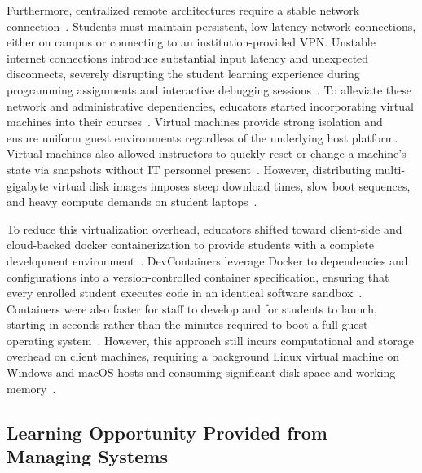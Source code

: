 Furthermore, centralized remote architectures require a stable network connection~\cite{valstarUsingDevContainersStandardize2020}.
Students must maintain persistent, low-latency network connections, either on
campus or connecting to an institution-provided VPN. Unstable internet connections
introduce substantial input latency and unexpected disconnects, severely
disrupting the student learning experience during programming assignments and
interactive debugging sessions~\cite{valstarUsingDevContainersStandardize2020}. To
alleviate these network and administrative dependencies, educators started
incorporating virtual machines into their courses~\cite{harvieUsingVirtualMachines2019,stokerUsingVirtualMachines2013}.
Virtual machines provide strong isolation and ensure uniform guest environments regardless
of the underlying host platform. Virtual machines also allowed instructors to
quickly reset or change a machine's state via snapshots without IT personnel
present~\cite{stokerUsingVirtualMachines2013,harvieUsingVirtualMachines2019}. However,
distributing multi-gigabyte virtual disk images imposes steep download times, slow
boot sequences, and heavy compute demands on student laptops~\cite{malanContainerizingCS50Standardizing2024,stokerUsingVirtualMachines2013}.

To reduce this virtualization overhead, educators shifted toward client-side and cloud-backed
docker containerization to provide students with a complete development environment~\cite{valstarUsingDevContainersStandardize2020,malanContainerizingCS50Standardizing2024}.
DevContainers leverage Docker to dependencies and configurations into a version-controlled
container specification, ensuring that every enrolled student executes code in an
identical software sandbox~\cite{valstarUsingDevContainersStandardize2020}.
Containers were also faster for staff to develop and for students to launch, starting
in seconds rather than the minutes required to boot a full guest operating system~\cite{malanContainerizingCS50Standardizing2024,valstarUsingDevContainersStandardize2020}.
However, this approach still incurs computational and storage overhead on client machines,
requiring a background Linux virtual machine on Windows and macOS hosts and
consuming significant disk space and working memory~\cite{valstarUsingDevContainersStandardize2020}.

\subsection{Learning Opportunity Provided from Managing Systems}


